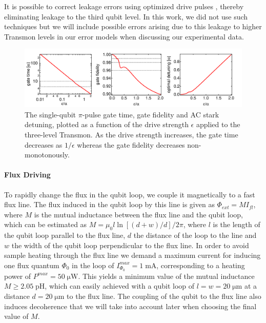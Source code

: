 \smallskip

It is possible to correct leakage errors using optimized drive pulses \cite{lucero_reduced_2010,chow_optimized_2010}, thereby eliminating leakage to the third qubit level. In this work, we did not use such techniques but we will  include possible errors arising due to this leakage to higher Transmon levels in our error models when discussing our experimental data.

\begin{figure}[htp!]
	\centering
	\includegraphics[width=\textwidth]{"./material/mathematica/three_level_driving_errors"}
	\caption[Single-qubit $\pi$-pulse gate time, gate fidelity and AC stark detuning as a function of drive strength]{The single-qubit $\pi$-pulse gate time, gate fidelity and AC stark detuning, plotted as a function of the drive strength $\epsilon$ applied to the three-level Transmon. As the drive strength increases, the gate time decreases as $1/\epsilon$ whereas the gate fidelity decreases non-monotonously.}
	\label{fig:three_level_driving_errors}
\end{figure}

\paragraph{Flux Driving}

To rapidly change the flux in the qubit loop, we couple it magnetically to a fast flux line. The flux induced in the qubit loop by this line is given as $\Phi_{ext}=M I_{fl}$, where $M$ is the mutual inductance between the flux line and the qubit loop, which can be estimated as $M=\mu_0 l \ln{\left[(d+w)/d\right]}/2\pi$, where $l$ is the length of the qubit loop parallel to the flux line, $d$ the distance of the loop to the line and $w$ the width of the qubit loop perpendicular to the flux line. In order to avoid sample heating through the flux line we demand a maximum current for inducing one flux quantum $\Phi_0$ in the loop of $I_{\Phi_0}^{max}=1\;\mathrm{mA}$, corresponding to a heating power of $P^{max}=50\;\mathrm{\mu W}$. This yields a minimum value of the mutual inductance $M\ge 2.05\;\mathrm{pH}$, which can easily achieved with a qubit loop of $l=w=20\;\mathrm{\mu m}$ at a distance $d=20\;\mathrm{\mu m}$ to the flux line. The coupling of the qubit to the flux line also induces decoherence that we will take into account later when choosing the final value of $M$.

